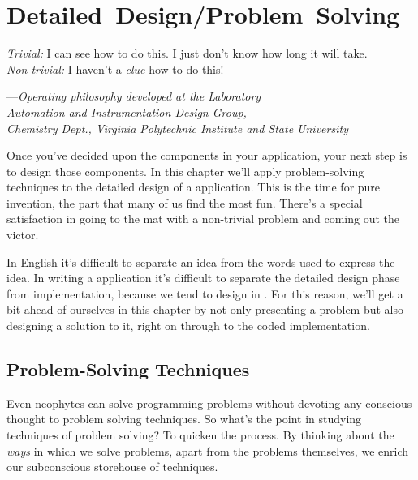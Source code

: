 
\chapter{Detailed~Design/\allowhyphens Problem~Solving}
%
%
\begin{tfquot}
\emph{Trivial:} I can see how to do this. I just don't know how long it
will take.\\
\emph{Non-trivial:} I haven't a \emph{clue} how to do this!

\begin{flushright}
---\emph{Operating philosophy developed at the Laboratory\\
Automation and Instrumentation Design Group,\\
Chemistry Dept., Virginia Polytechnic Institute and State University}
\end{flushright}
\end{tfquot}
Once you've decided upon the components in your application, your next
step is to design those components. In this chapter we'll apply
problem-solving techniques to the detailed design of a \Forth{}
application.  This is the time for pure invention, the part that many of
us find the most fun. There's a special satisfaction in going to the mat
with a non-trivial problem and coming out the victor.

In English it's difficult to separate an idea from the words used to
express the idea. In writing a \Forth{} application it's difficult to
separate the detailed design phase from implementation, because we tend to
design in \Forth{}. For this reason, we'll get a bit ahead of ourselves in
this chapter by not only presenting a problem but also designing a
solution to it, right on through to the coded implementation.

\section{Problem-Solving Techniques}%
%

Even neophytes can solve programming problems without devoting any
conscious thought to problem solving techniques. So what's the point in
studying techniques of problem solving? To quicken the process. By
thinking about the \emph{ways} in which we solve problems, apart from
the problems themselves, we enrich our subconscious storehouse of
techniques.

